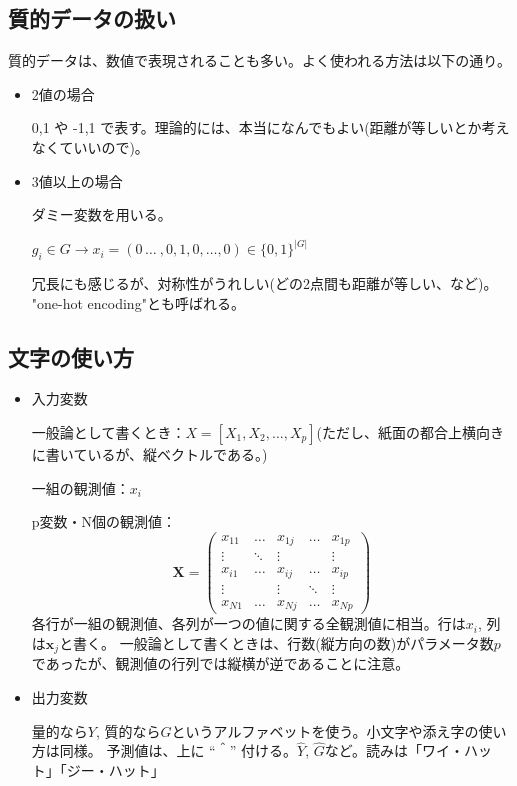 \documentclass{jsarticle}
\begin{document}
\subsection{質的データの扱い}
質的データは、数値で表現されることも多い。よく使われる方法は以下の通り。

\begin{itemize}

  \item 2値の場合

  0,1 や -1,1 で表す。理論的には、本当になんでもよい(距離が等しいとか考えなくていいので)。

  \item 3値以上の場合

  ダミー変数を用いる。

  $g_i \in G \to x_i = ( 0 \, \dots \ , 0, 1, 0, \dots ,0 ) \in \{0,1\}^{|G|}$

  冗長にも感じるが、対称性がうれしい(どの2点間も距離が等しい、など)。
  "one-hot encoding"とも呼ばれる。
\end{itemize}

\subsection{文字の使い方}
\begin{itemize}

  \item 入力変数

  一般論として書くとき：$X=[X_1, X_2, \dots , X_p]$(ただし、紙面の都合上横向きに書いているが、縦ベクトルである。)

  一組の観測値：$x_i$

  p変数・N個の観測値：
  \[
    \mathbf{X} = \left(
      \begin{array}{ccccc}
        x_{11} & \dots & x_{1j} & \dots & x_{1p} \\
        \vdots & \ddots & \vdots & \ & \vdots \\
        x_{i1} & \dots  & x_{ij} & \dots & x_{ip} \\
        \vdots & \ & \vdots & \ddots & \vdots \\
        x_{N1} & \dots & x_{Nj} & \dots & x_{Np}
      \end{array}
    \right)
  \]
  各行が一組の観測値、各列が一つの値に関する全観測値に相当。行は$x_i$, 列は$\mathbf{x}_j$と書く。
  一般論として書くときは、行数(縦方向の数)がパラメータ数$p$であったが、観測値の行列では縦横が逆であることに注意。
  \item 出力変数

  量的なら$Y$, 質的なら$G$というアルファベットを使う。小文字や添え字の使い方は同様。
  予測値は、上に ``＾'' 付ける。$\hat{Y}$, $\hat{G}$など。読みは「ワイ・ハット」「ジー・ハット」
\end{itemize}
\end{document}
